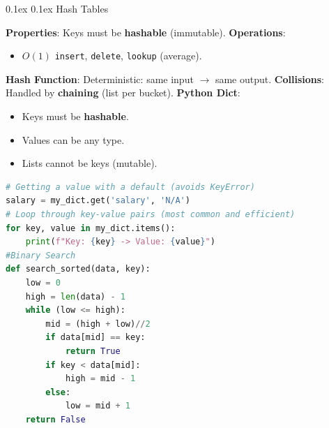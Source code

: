 \documentclass[8pt,landscape]{article}
\makeatletter
\renewcommand{\subsection}{\@startsection{subsection}{2}{0pt}%
    {0.1ex}%
    {0.1ex}%
    {\fontsize{8}{9}\bfseries\color{blue}}} %
\newcommand{\code}[1]{\textcolor{myred}{\texttt{#1}}}
\newcommand{\smalltext}[1]{%
  {\fontsize{8}{9}\selectfont\sloppy #1\par}%
}
\makeatother
\begin{document}
\begin{multicols}{3}
\subsection{Hash Tables}
\smalltext{
\textbf{Properties}: Keys must be \textbf{hashable} (immutable).
\textbf{Operations}:
\begin{itemize}[noitemsep, nolistsep, leftmargin=1em]
    \item $O(1)$ \code{insert}, \code{delete}, \code{lookup} (average).
\end{itemize}
\textbf{Hash Function}: Deterministic: same input $\to$ same output.
\textbf{Collisions}: Handled by \textbf{chaining} (list per bucket).
\textbf{Python Dict}:
\begin{itemize}[noitemsep, nolistsep, leftmargin=1em]
    \item Keys must be \textbf{hashable}.
    \item Values can be any type.
    \item Lists cannot be keys (mutable).
\end{itemize}
}
\begin{lstlisting}[language=Python]
# Getting a value with a default (avoids KeyError)
salary = my_dict.get('salary', 'N/A')
# Loop through key-value pairs (most common and efficient)
for key, value in my_dict.items():
    print(f"Key: {key} -> Value: {value}")
#Binary Search
def search_sorted(data, key):
    low = 0
    high = len(data) - 1
    while (low <= high):
        mid = (high + low)//2
        if data[mid] == key:
            return True
        if key < data[mid]:
            high = mid - 1
        else:
            low = mid + 1
    return False
\end{lstlisting}


\end{multicols}
\end{document}
